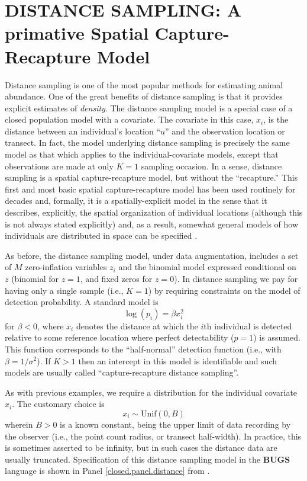 \section{DISTANCE SAMPLING: A primative Spatial Capture-Recapture Model}

Distance sampling is one of the most popular methods for estimating
animal abundance. One of the great benefits of distance sampling is
that it provides explicit estimates of {\it density}. The distance
sampling model is a special case of a closed population model with a
covariate. The covariate in this case, $x_{i}$, is the distance
between an individual's location ``$u$'' and the observation location
or transect. In fact, the model underlying distance sampling is
precisely the same model as that which applies to the
individual-covariate models, except that observations are made at only
$K=1$ sampling occasion. In a sense, distance sampling is a spatial
capture-recapture model, but without the ``recapture.''  This first
and most basic spatial capture-recapture model has been used routinely
for decades and, formally, it is a spatially-explicit model in the
sense that it describes, explicitly, the spatial organization of
individual locations (although this is not always stated explicitly)
and, as a result, somewhat general models of how individuals are
distributed in space can be specified \citep{royle_etal:2004,
  johnson_etal:2010, sillett_etal:2011}.

As before, the distance sampling model, under data augmentation,
includes a set of $M$ zero-inflation variables $z_{i}$ and the
binomial model expressed conditional on $z$ (binomial for $z=1$, and
fixed zeros for $z=0$).  In distance sampling we pay for having only a
single sample (i.e., $K=1$) by requiring constraints on the model of
detection probability. A standard model is
\[
\log(p_{i}) = \beta x_{i}^{2}
\]
for $\beta < 0$, where $x_i$ denotes the distance at which the $i$th
individual is detected relative to some reference location where
perfect detectability ($p=1$) is assumed. This function corresponds to
the ``half-normal'' detection function (i.e., with $\beta =
1/\sigma^{2}$).  If $K>1$ then an intercept in this model is
identifiable and
such models are usually called ``capture-recapture distance
sampling''\citep{alpizar_pollock:1996,borchers_etal:1998}.

As with previous examples, we require a distribution for the individual covariate $x_{i}$. The customary choice is
\[
x_{i} \sim \mbox{Unif}(0,B)
\]
wherein $B>0$ is a known constant, being the upper limit of data
recording by the observer (i.e., the point count radius, or transect
half-width). In practice, this is sometimes asserted to be infinity,
but in such cases the distance data are usually truncated.
Specification of this distance sampling model in the {\bf BUGS} language is
shown in Panel \ref{closed.panel.distance} from \citet{royle_dorazio:2008}.


